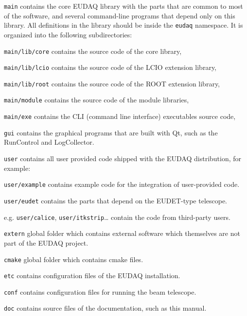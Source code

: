 \begin{myitemize}
\item \texttt{main}
  contains the core EUDAQ library with the parts that are common to most of the software,
  and several command-line programs that depend only on this library.
  All definitions in the library should be inside the \texttt{eudaq} namespace.
  It is organized into the following subdirectories:
  \begin{myitemize}
  \item \texttt{main/lib/core}
    contains the source code of the core library,
  \item \texttt{main/lib/lcio}
    contains the source code of the LCIO extension library,
  \item \texttt{main/lib/root}
    contains the source code of the ROOT extension library,
  \item \texttt{main/module}
    contains the source code of the module libraries,
  \item \texttt{main/exe}
    contains the CLI (command line interface) executables source code,
  \end{myitemize}
\item \texttt{gui}
  contains the graphical programs that are built with Qt, such as the RunControl and LogCollector.
\item \texttt{user}
  contains all user provided code shipped with the EUDAQ
  distribution, for example:
  \begin{myitemize}
\item \texttt{user/example}
  contains example code for the integration of user-provided code.
\item \texttt{user/eudet}
  contains the parts that depend on the EUDET-type telescope.
\item e.g. \texttt{user/calice}, \texttt{user/itkstrip}\ldots{}
  contain the code from third-party users.
  \end{myitemize}
\item \texttt{extern}
  global folder which contains external software which themselves are not part of the EUDAQ project.
\item \texttt{cmake}
  global folder which contains cmake files.
\item \texttt{etc}
  contains configuration files of the EUDAQ installation.
\item \texttt{conf}
  contains configuration files for running the beam telescope.
\item \texttt{doc}
  contains source files of the documentation, such as this manual.
\end{myitemize}

